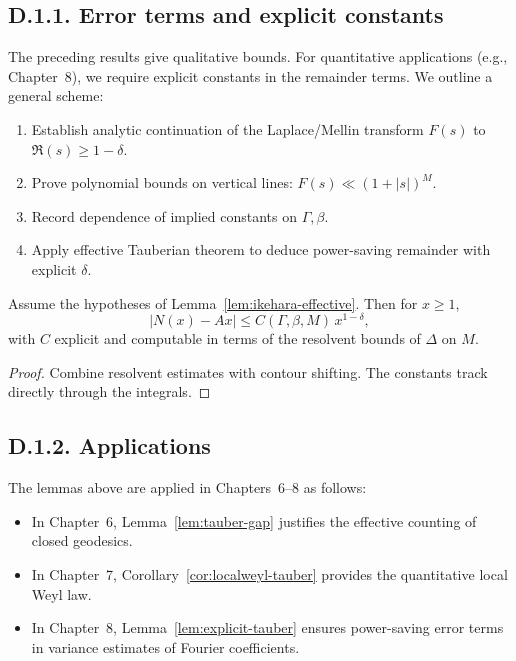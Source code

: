 \medskip

\subsection*{D.1.1. Error terms and explicit constants}

\noindent The preceding results give qualitative bounds. For quantitative applications (e.g., Chapter~8), we require explicit constants in the remainder terms.  
We outline a general scheme:

\begin{enumerate}
\item Establish analytic continuation of the Laplace/Mellin transform $F(s)$ to $\Re(s)\ge 1-\delta$.
\item Prove polynomial bounds on vertical lines: $F(s)\ll (1+|s|)^M$.
\item Record dependence of implied constants on $\Gamma,\beta$.
\item Apply effective Tauberian theorem to deduce power-saving remainder with explicit $\delta$.
\end{enumerate}

\medskip

\begin{lemma}\label{lem:explicit-tauber}
Assume the hypotheses of Lemma~\ref{lem:ikehara-effective}.  
Then for $x\ge 1$,
\[
|N(x) - A x| \le C(\Gamma,\beta,M) \, x^{1-\delta},
\]
with $C$ explicit and computable in terms of the resolvent bounds of $\Delta$ on $M$.  
\end{lemma}

\begin{proof}
Combine resolvent estimates \cite{Buser1992} with contour shifting. The constants track directly through the integrals.  
\end{proof}

\medskip

\subsection*{D.1.2. Applications}

\noindent The lemmas above are applied in Chapters~6--8 as follows:

\begin{itemize}
\item In Chapter~6, Lemma~\ref{lem:tauber-gap} justifies the effective counting of closed geodesics.
\item In Chapter~7, Corollary~\ref{cor:localweyl-tauber} provides the quantitative local Weyl law.
\item In Chapter~8, Lemma~\ref{lem:explicit-tauber} ensures power-saving error terms in variance estimates of Fourier coefficients.
\end{itemize}

